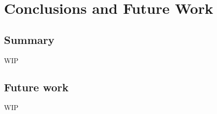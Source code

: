 \chapter{Conclusions and Future Work}
\label{chap:conclusion}
\chaptoc{}


\newpage
\section{Summary}
\label{sec:summary}
\begin{colsection}


\begin{colsection}

WIP

\end{colsection}


\end{colsection}


\newpage
\section{Future work}
\label{sec:future}
\begin{colsection}


\begin{colsection}

WIP
\citep{GW150914, GW150914_followup, GW151226}

\end{colsection}


\end{colsection}

